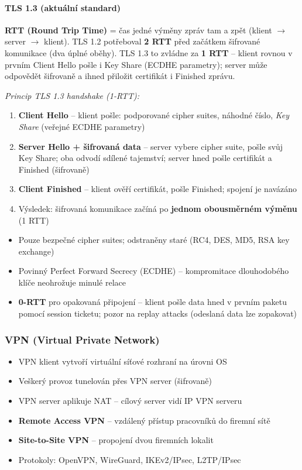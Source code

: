 \paragraph{TLS 1.3 (aktuální standard)}

\textbf{RTT (Round Trip Time)} = čas jedné výměny zpráv tam a zpět (klient $\to$ server $\to$ klient).
TLS 1.2 potřeboval \textbf{2 RTT} před začátkem šifrované komunikace (dva úplné oběhy).
TLS 1.3 to zvládne za \textbf{1 RTT} -- klient rovnou v prvním Client Hello pošle i Key Share (ECDHE parametry); server může odpovědět šifrovaně a ihned přiložit certifikát i Finished zprávu.

\textit{Princip TLS 1.3 handshake (1-RTT):}
\begin{enumerate}
  \item \textbf{Client Hello} -- klient pošle: podporované cipher suites, náhodné číslo, \textit{Key Share} (veřejné ECDHE parametry)
  \item \textbf{Server Hello + šifrovaná data} -- server vybere cipher suite, pošle svůj Key Share; oba odvodí sdílené tajemství; server hned pošle certifikát a Finished (šifrovaně)
  \item \textbf{Client Finished} -- klient ověří certifikát, pošle Finished; spojení je navázáno
  \item Výsledek: šifrovaná komunikace začíná po \textbf{jednom obousměrném výměnu} (1 RTT)
\end{enumerate}

\begin{itemize}
  \item Pouze bezpečné cipher suites; odstraněny staré (RC4, DES, MD5, RSA key exchange)
  \item Povinný Perfect Forward Secrecy (ECDHE) -- kompromitace dlouhodobého klíče neohrožuje minulé relace
  \item \textbf{0-RTT} pro opakovaná připojení -- klient pošle data hned v prvním paketu pomocí session ticketu; pozor na replay attacks (odeslaná data lze zopakovat)
\end{itemize}

\subsubsection{VPN (Virtual Private Network)}

\begin{itemize}
  \item VPN klient vytvoří virtuální síťové rozhraní na úrovni OS
  \item Veškerý provoz tunelován přes VPN server (šifrovaně)
  \item VPN server aplikuje NAT -- cílový server vidí IP VPN serveru
  \item \textbf{Remote Access VPN} -- vzdálený přístup pracovníků do firemní sítě
  \item \textbf{Site-to-Site VPN} -- propojení dvou firemních lokalit
  \item Protokoly: OpenVPN, WireGuard, IKEv2/IPsec, L2TP/IPsec
\end{itemize}

